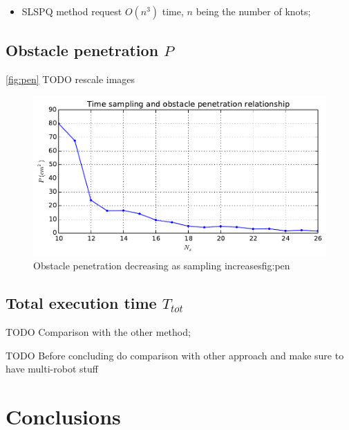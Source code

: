 \documentclass[eprint]{actapoly}
\begin{document}
\begin{itemize}
 \item 
 SLSPQ method request $O(n^3)$ time, $n$ being the number of knots; 
\end{itemize}

\subsection{Obstacle penetration $P$}

\ref{fig:pen}
TODO rescale images

\begin{figure}[!h]\centering
  \includegraphics[width=\linewidth]{./images/penetration/pen-nsi.pdf} %
  \caption{Obstacle penetration decreasing as sampling increases{fig:pen}}
\label{fig:res}
\end{figure}


\subsection{Total execution time $T_{tot}$}





TODO Comparison with the other method;

TODO Before concluding do comparison with other approach and make sure to have 
multi-robot stuff

\section{Conclusions}
\end{document}
